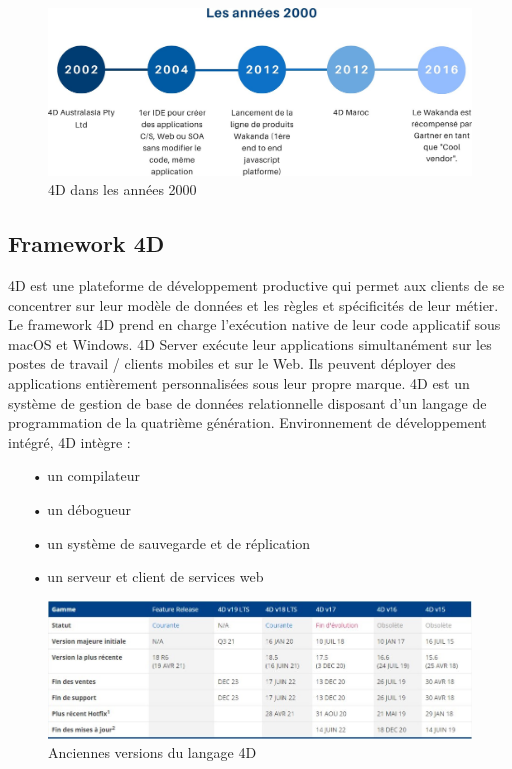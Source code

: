 \begin{figure}[h]
    \centering
    \includegraphics[scale=0.3]{Images/20.jpg} %
    \caption{4D dans les années 2000}
    \label{fig:Histoire90}
\end{figure}


\subsection{Framework 4D}
4D est une plateforme de développement productive qui permet aux clients de se concentrer sur leur modèle de données et les règles et spécificités de leur métier. Le framework 4D prend en charge l’exécution native de leur code applicatif sous macOS et Windows. 4D Server exécute leur applications simultanément sur les postes de travail / clients mobiles et sur le Web. Ils peuvent déployer des applications entièrement personnalisées sous leur propre marque.
4D est un système de gestion de base de données relationnelle disposant d’un langage de programmation de la quatrième génération. Environnement de développement intégré, 4D intègre :
\newline

\begin{itemize}
    \item[•] un compilateur
    \item[•] un débogueur
    \item[•] un système de sauvegarde et de réplication
    \item[•] un serveur et client de services web
    \newline
\end{itemize}

 
\begin{figure}[h]
    \centering
    \includegraphics[scale=0.6]{Images/versions.jpg} %
    \caption{Anciennes versions du langage 4D}
    \label{fig:Histoire90}
\end{figure}

